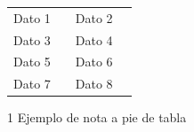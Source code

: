 \begin{multicols}{2}
\begin{table}[H]
\begin{threeparttable}
{\begin{tabular}{M{0.4\linewidth}M{0.4\linewidth}}
    Dato 1 & Dato 2 \\
    Dato 3 & Dato 4 \\
    Dato 5 & Dato 6 \\
    Dato 7 & Dato 8 \\

    \hline
\end{tabular}

}

\begin{tablenotes}\tiny %
    \item[1] Ejemplo de nota a pie de tabla
\end{tablenotes}

\end{threeparttable}
\end{table}

\end{multicols}